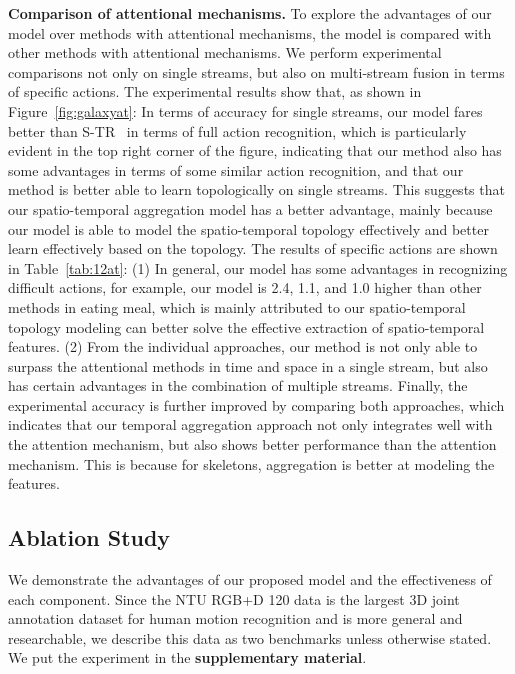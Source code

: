 \documentclass[letterpaper]{article} \usepackage[submission]{aaai23}  \usepackage{times}  \usepackage{helvet}  \usepackage{courier}  \usepackage[hyphens]{url}  \usepackage{graphicx} \urlstyle{rm} \def\UrlFont{\rm}  \usepackage{natbib}  \usepackage{caption} \frenchspacing  \setlength{\pdfpagewidth}{8.5in} \setlength{\pdfpageheight}{11in} \usepackage{algorithm}
\begin{document}
\noindent
{\bf Comparison of attentional mechanisms.} To explore the advantages of our model over methods with attentional mechanisms, the model is compared with other methods with attentional mechanisms. We perform experimental comparisons not only on single streams, but also on multi-stream fusion in terms of specific actions. The experimental results show that, as shown in Figure~\ref{fig:galaxyat}: In terms of accuracy for single streams, our model fares better than S-TR~\cite{2020sttr} in terms of full action recognition, which is particularly evident in the top right corner of the figure, indicating that our method also has some advantages in terms of some similar action recognition, and that our method is better able to learn topologically on single streams. This suggests that our spatio-temporal aggregation model has a better advantage, mainly because our model is able to model the spatio-temporal topology effectively and better learn effectively based on the topology. The results of specific actions are shown in Table~\ref{tab:12at}: (1) In general, our model has some advantages in recognizing difficult actions, for example, our model is 2.4, 1.1, and 1.0 higher than other methods in eating meal, which is mainly attributed to our spatio-temporal topology modeling can better solve the effective extraction of spatio-temporal features. (2) From the individual approaches, our method is not only able to surpass the attentional methods in time and space in a single stream, but also has certain advantages in the combination of multiple streams. Finally, the experimental accuracy is further improved by comparing both approaches, which indicates that our temporal aggregation approach not only integrates well with the attention mechanism, but also shows better performance than the attention mechanism. This is because for skeletons, aggregation is better at modeling the features. 
\subsection{Ablation Study}
\label{sec:DA}

We demonstrate the advantages of our proposed model and the effectiveness of each component. Since the NTU RGB+D 120 data is the largest 3D joint annotation dataset for human motion recognition and is more general and researchable, we describe this data as two benchmarks unless otherwise stated. We put the experiment in the {\bf supplementary material}.
\end{document}
